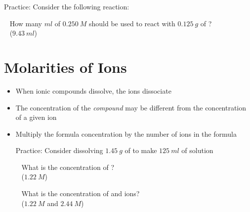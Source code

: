 \documentclass[12pt, openany, letterpaper]{memoir}
\begin{document}
\begin{itemize}
	Practice: Consider the following reaction: 
	
	~\hphantom{Practice:} How many $ml$ of $0.250~M$ should be used to react with $0.125~g$ of ?\\	
	~\hphantom{Practice: } ($9.43~ml$)	
\end{itemize}
\section{Molarities of Ions}
\begin{itemize}
	\item When ionic compounds dissolve, the ions dissociate
	\item The concentration of the \emph{compound} may be different from the concentration of a given ion
	\item Multiply the formula concentration by the number of ions in the formula
	
	Practice: Consider dissolving $1.45~g$ of  to make $125~ml$ of solution
	
	~\hphantom{Practice:} What is the concentration of ?\\	
	~\hphantom{Practice: } ($1.22~M$)	
	
	~\hphantom{Practice:} What is the concentration of  and  ions?\\
	~\hphantom{Practice: } ($1.22~M$ and $2.44~M$)	
\end{itemize}
\end{document}

